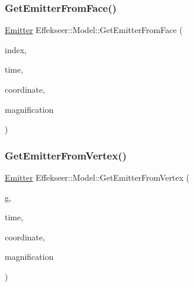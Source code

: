 \mbox{\label{class_effekseer_1_1_model_a1bd509af3054aeee73aaf495732e3f4a}} 
\subsubsection{\texorpdfstring{Get\+Emitter\+From\+Face()}{GetEmitterFromFace()}\hspace{0.1cm}{\footnotesize\ttfamily [2/2]}}
{\footnotesize\ttfamily \mbox{\hyperlink{struct_effekseer_1_1_model_1_1_emitter}{Emitter}} Effekseer\+::\+Model\+::\+Get\+Emitter\+From\+Face (\begin{DoxyParamCaption}\item[{int32\+\_\+t}]{index,  }\item[{int32\+\_\+t}]{time,  }\item[{\mbox{\hyperlink{namespace_effekseer_ac8508f8823c5fcf36aac5d2ddee23765}{Coordinate\+System}}}]{coordinate,  }\item[{float}]{magnification }\end{DoxyParamCaption})\hspace{0.3cm}{\ttfamily [inline]}}

\mbox{\label{class_effekseer_1_1_model_a903c0b92208cebf971846956770fb681}} 
\subsubsection{\texorpdfstring{Get\+Emitter\+From\+Vertex()}{GetEmitterFromVertex()}\hspace{0.1cm}{\footnotesize\ttfamily [1/2]}}
{\footnotesize\ttfamily \mbox{\hyperlink{struct_effekseer_1_1_model_1_1_emitter}{Emitter}} Effekseer\+::\+Model\+::\+Get\+Emitter\+From\+Vertex (\begin{DoxyParamCaption}\item[{\mbox{\hyperlink{class_effekseer_1_1_i_rand_object}{I\+Rand\+Object}} $\ast$}]{g,  }\item[{int32\+\_\+t}]{time,  }\item[{\mbox{\hyperlink{namespace_effekseer_ac8508f8823c5fcf36aac5d2ddee23765}{Coordinate\+System}}}]{coordinate,  }\item[{float}]{magnification }\end{DoxyParamCaption})\hspace{0.3cm}{\ttfamily [inline]}}

